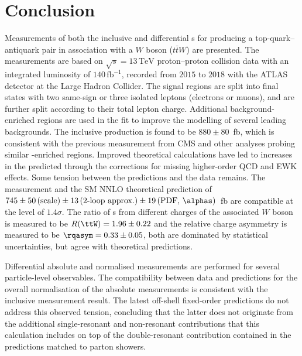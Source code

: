 \documentclass[cernpreprint, atlasdraft=false, texlive=2023, UKenglish, texmf, orcidlogo]{atlasdoc}
\begin{document}

 


 
 
\FloatBarrier
 
\section{Conclusion}
\label{sec:conclusion}

Measurements of both the inclusive and differential \xs{}s for
producing a top-quark--antiquark pair in association with a $W$ boson
($t\bar{t}W$) are presented. The measurements are based on $\sqrt{s} =
13\,\mathrm{TeV}$ proton--proton collision data with an integrated
luminosity of $140\,\mathrm{fb}^{-1}$, recorded from $2015$ to $2018$
with the ATLAS detector at the Large Hadron Collider. The signal
regions are split into final states with two same-sign or three
isolated leptons (electrons or muons), and are further split according
to their total lepton charge. Additional background-enriched regions
are used in the fit to improve the modelling of several leading
backgrounds.  The inclusive \ttW production \xs is found to be
$880\pm80$~fb, which is consistent with the previous measurement from
CMS and other analyses probing similar \ttW-enriched regions.
Improved theoretical calculations have led to increases in the
predicted \xs through the corrections for missing higher-order QCD and
EWK effects.  Some tension between the predictions and the data
remains.  The measurement and the SM NNLO theoretical prediction of
$745\pm 50\,\textrm{(scale)}\pm 13\,\textrm{(2-loop approx.)}\pm
19\,\textrm{(PDF, \alphas)}$~fb are compatible at the level of
$1.4\sigma$.  The ratio of \xs{}s from different charges of the
associated $W$ boson is measured to be $R(\ttW) = 1.96\pm0.22$ and the
relative charge asymmetry is measured to be $\rqasym = 0.33\pm0.05$,
both are dominated by statistical uncertainties, but agree
with theoretical predictions.
 
Differential absolute and normalised \xs measurements are performed for several particle-level observables.
The compatibility between data and predictions for the overall normalisation of the absolute \xs measurements
is consistent with the inclusive measurement result. The latest off-shell fixed-order predictions do not address this
observed tension, concluding that the latter does not originate from the additional single-resonant and non-resonant
contributions that this calculation includes on top of the double-resonant contribution contained in the predictions
matched to parton showers.
 
\end{document}
